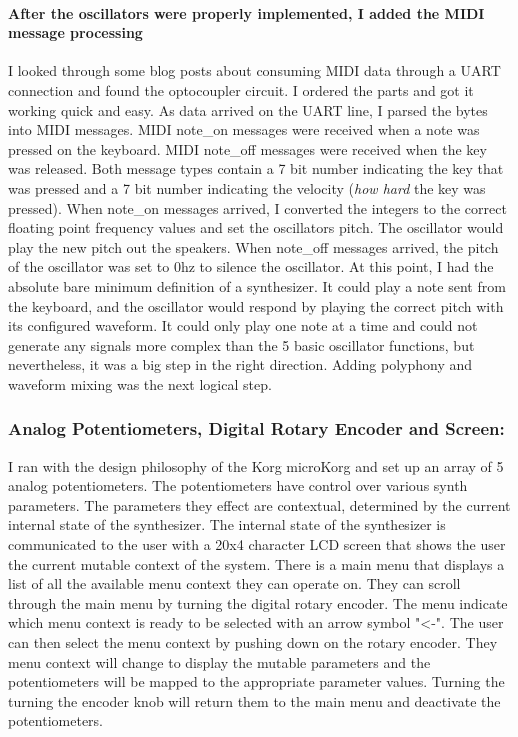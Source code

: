 \documentclass[acmlarge,screen]{acmart}
\begin{document}
	\paragraph{After the oscillators were properly implemented, I added the MIDI message processing} I looked through some blog posts about consuming MIDI data through a UART connection and found the optocoupler circuit. I ordered the parts and got it working quick and easy. As data arrived on the UART line, I parsed the bytes into MIDI messages. MIDI note\_on messages were received when a note was pressed on the keyboard. MIDI note\_off messages were received when the key was released. Both message types contain a 7 bit number indicating the key that was pressed and a 7 bit number indicating the velocity (\textit{how hard} the key was pressed).\cite{huber_2007} When note\_on messages arrived, I converted the integers to the correct floating point frequency values and set the oscillators pitch. The oscillator would play the new pitch out the speakers. When note\_off messages arrived, the pitch of the oscillator was set to 0hz to silence the oscillator. At this point, I had the absolute bare minimum definition of a synthesizer. It could play a note sent from the keyboard, and the oscillator would respond by playing the correct pitch with its configured waveform. It could only play one note at a time and could not generate any signals more complex than the 5 basic oscillator functions, but nevertheless, it was a big step in the right direction. Adding polyphony and waveform mixing was the next logical step.	
	
	
	\subsubsection{Analog Potentiometers, Digital Rotary Encoder and Screen:}
	I ran with the design philosophy of the Korg microKorg and set up an array of 5 analog potentiometers. The potentiometers have control over various synth parameters. The parameters they effect are contextual, determined by the current internal state of the synthesizer. The internal state of the synthesizer is communicated to the user with a 20x4 character LCD screen that shows the user the current mutable context of the system. There is a main menu that displays a list of all the available menu context they can operate on. They can scroll through the main menu by turning the digital rotary encoder. The menu indicate which menu context is ready to be selected with an arrow symbol "<-". The user can then select the menu context by pushing down on the rotary encoder. They menu context will change to display the mutable parameters and the potentiometers will be mapped to the appropriate parameter values. Turning the turning the encoder knob will return them to the main menu and deactivate the potentiometers.
\end{document}
